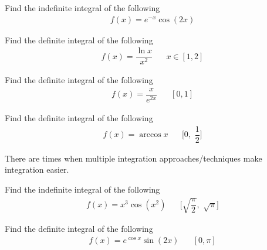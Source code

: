 \begin{exercise}
Find the indefinite integral of the following
\begin{align*}
    f(x) = e^{-x} \cos(2x)
\end{align*}
\end{exercise}

\begin{exercise}
Find the definite integral of the following
\begin{align*}
    f(x) = \dfrac{\ln x}{x^{2}} \hspace{20pt} x \in [1, 2]
\end{align*}
\end{exercise}

\begin{exercise}
Find the definite integral of the following
\begin{align*}
    f(x) = \dfrac{x}{e^{2x}} \hspace{20pt} [0, 1]
\end{align*}
\end{exercise}

\begin{exercise}
Find the definite integral of the following
\begin{align*}
    f(x) = \arccos x \hspace{20pt} \Big[0, \hspace{4pt} \dfrac{1}{2}\Big]
\end{align*}
\end{exercise}

\begin{note}
There are times when multiple integration approaches/techniques make integration easier.
\end{note}

\begin{exercise}
Find the indefinite integral of the following
\begin{align*}
    f(x) = x^{3} \cos(x^{2}) \hspace{20pt} \Big[\sqrt{\dfrac{\pi}{2}}, \hspace{4pt} \sqrt{\pi} \Big]
\end{align*}
\end{exercise}

\begin{exercise}
Find the definite integral of the following
\begin{align*}
    f(x) = e^{\cos x} \sin(2x) \hspace{20pt} [0, \pi]
\end{align*}
\end{exercise}

